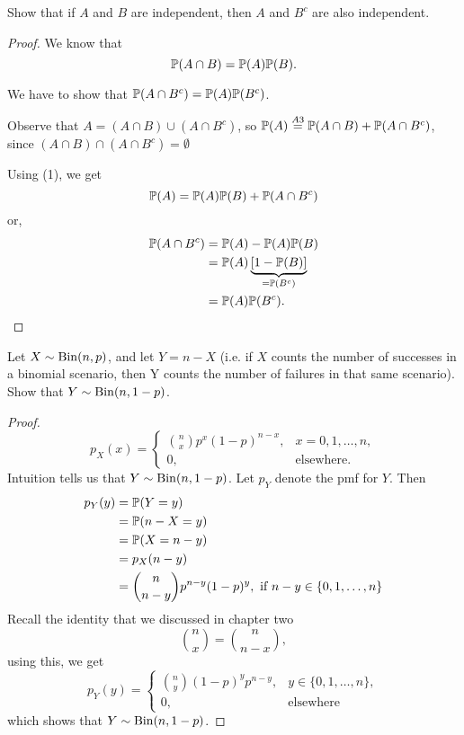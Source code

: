 \documentclass[10pt, a4paper]{article}
\begin{document}
\begin{problem}[68]
    Show that if $A$ and $B$ are independent,
    then $A$ and $B ^ c$ are also independent.
    \begin{proof}
        We know that
        \begin{equation}
            \P(A \cap B) = \P(A)\P(B).
        \end{equation}

        We have to show that $\P(A \cap B ^ c) = \P(A)\P(B ^ c)$.

        Observe that $A = (A \cap B) \cup (A \cap B ^ c)$,
        so $\P(A) \overset{A3}{=} \P(A \cap B) + \P(A \cap B ^ c)$,
        since $(A \cap B) \cap (A \cap B ^ c) = \emptyset$

        Using (1), we get
        \[
        \P(A) = \P(A)\P(B) + \P(A \cap B ^ c)
        \]
        or,
        \begin{align*}
            \P(A \cap B ^ c) &= \P(A) - \P(A)\P(B) \\
            &= \P(A)\underbrace{\left[1 - \P(B)\right]}_{= \P(B ^ c)} \\
            &= \P(A)\P(B ^ c).
        \end{align*}
    \end{proof}
\end{problem}

\begin{problem}[93]
    Let $X \sim \Bin(n, p)$,
    and let $Y = n - X$
    (i.e. if $X$ counts the number of successes in a binomial scenario,
    then Y counts the number of failures in that same scenario).
    Show that $Y \sim \Bin(n, 1 - p)$.
    \begin{proof}
        \[
        p_X(x) = \begin{cases}
            \binom{n}{x}p ^ x (1 - p) ^ {n - x}, & x = 0, 1, \dotsc, n, \\
            0,&\text{elsewhere}.
        \end{cases}
        \]
        Intuition tells us that $Y \sim \Bin(n, 1 - p)$.
        Let $p_Y$ denote the pmf for $Y$.
        Then
        \begin{align*}
            p_Y(y) &= \P(Y = y) \\
            &= \P(n - X = y) \\
            &= \P(X = n - y) \\
            &= p_X(n - y) \\
            &= \binom{n}{n - y}p ^ {n - y}(1 - p) ^ y,\text{ if } n - y \in \{0, 1, \dotsc, n\}
        \end{align*}
        Recall the identity that we discussed in chapter two
        \[
        \binom{n}{x} = \binom{n}{n - x},
        \]
        using this,
        we get
        \[
        p_Y(y) =
        \begin{cases}
            \binom{n}{y}(1 - p) ^ y p ^ {n - y},& y \in \{0, 1, \dotsc, n\}, \\
            0, &\text{elsewhere}
        \end{cases}
        \]
        which shows that $Y \sim \Bin(n, 1 - p)$.
    \end{proof}
\end{problem}
\end{document}

